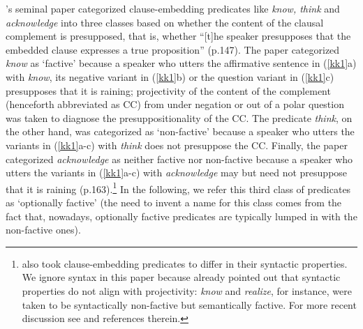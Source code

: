 \documentclass[11pt,fleqn]{article}
\newcommand{\6}{\mbox{$[\hspace*{-.6mm}[$}}
\newcommand{\9}{\mbox{$]\hspace*{-.6mm}]$}}
\newcommand{\citepos}[1]{\citeauthor{#1}'s \citeyear{#1}}
\begin{document}
\citepos{kiparsky-kiparsky70} seminal paper categorized clause-embedding predicates like {\em know, think} and {\em acknowledge} into three classes based on whether the content of the clausal complement is presupposed, that is, whether ``[t]he speaker presupposes that the embedded clause expresses a true proposition'' (p.147). The paper categorized {\em know} as `factive' because a speaker who utters the affirmative sentence in (\ref{kk1}a) with {\em know}, its negative variant in (\ref{kk1}b) or the question variant in (\ref{kk1}c) presupposes that it is raining; projectivity of the content of the complement (henceforth abbreviated as CC) from under negation or out of a polar question was taken to diagnose the presuppositionality of the CC. The predicate {\em think}, on the other hand, was categorized as `non-factive' because a speaker who utters the variants in (\ref{kk1}a-c) with {\em think} does not presuppose the CC. Finally, the paper categorized {\em acknowledge} as neither factive nor non-factive because a speaker who utters the variants in (\ref{kk1}a-c) with {\em acknowledge} may but need not presuppose that it is raining (p.163).\footnote{\citet{kiparsky-kiparsky70} also took clause-embedding predicates to differ in their syntactic properties. We ignore syntax in this paper because \citet[fn.3]{kiparsky-kiparsky70} already pointed out that syntactic properties do not align with projectivity: {\em know} and {\em realize}, for instance, were taken to be syntactically non-factive but semantically factive. For more recent discussion see \citealt{white-rawlins-nels2018} and references therein.} In the following, we refer this third class of predicates as `optionally factive' (the need to invent a name for this class comes from the fact that, nowadays, optionally factive predicates are typically lumped in with the non-factive ones).
\end{document}
